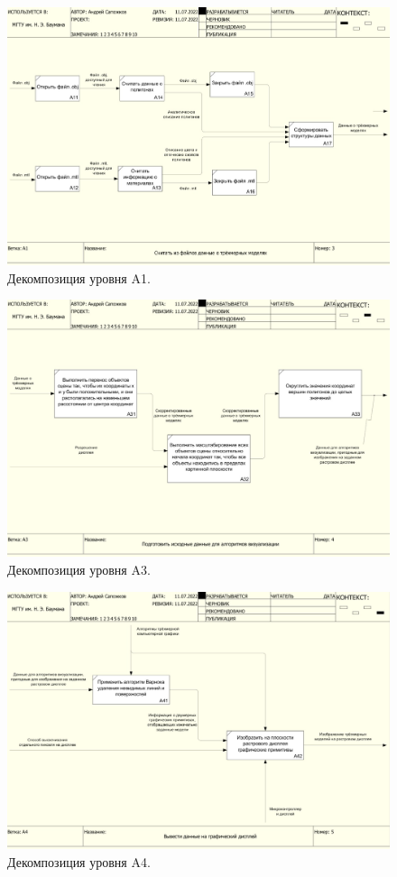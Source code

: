 \begin{figure}[h]
	\centering
	\includegraphics[width=\textwidth ]{img/IDEF0/A1_decomposition.jpg}
	\caption{Декомпозиция уровня A1.}
\end{figure} 

\begin{figure}[h]
	\centering
	\includegraphics[width=\textwidth ]{img/IDEF0/A3_decomposition.jpg}
	\caption{Декомпозиция уровня A3.}
\end{figure} 

\begin{figure}[h]
	\centering
	\includegraphics[width=\textwidth ]{img/IDEF0/A4_decomposition.jpg}
	\caption{Декомпозиция уровня A4.}
\end{figure} 

